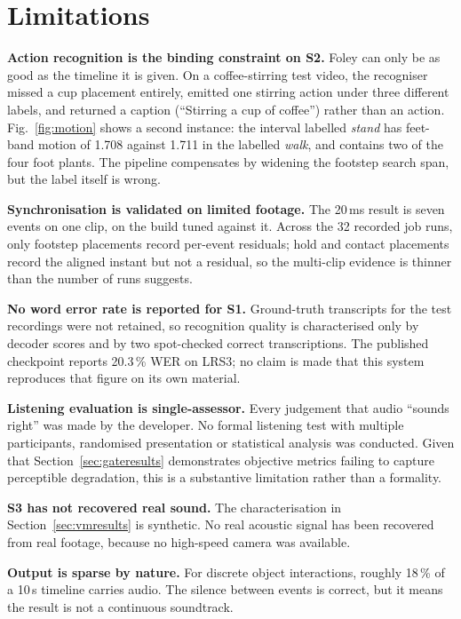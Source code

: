 \documentclass[conference]{IEEEtran}
\begin{document}
\section{Limitations}

\textbf{Action recognition is the binding constraint on S2.} Foley can only be as
good as the timeline it is given. On a coffee-stirring test video, the recogniser
missed a cup placement entirely, emitted one stirring action under three
different labels, and returned a caption (``Stirring a cup of coffee'') rather
than an action. Fig.~\ref{fig:motion} shows a second instance: the interval
labelled \emph{stand} has feet-band motion of 1.708 against 1.711 in the labelled
\emph{walk}, and contains two of the four foot plants. The pipeline compensates by
widening the footstep search span, but the label itself is wrong.

\textbf{Synchronisation is validated on limited footage.} The 20\,ms result is
seven events on one clip, on the build tuned against it. Across the 32 recorded
job runs, only footstep placements record per-event residuals; hold and contact
placements record the aligned instant but not a residual, so the multi-clip
evidence is thinner than the number of runs suggests.

\textbf{No word error rate is reported for S1.} Ground-truth transcripts for the
test recordings were not retained, so recognition quality is characterised only
by decoder scores and by two spot-checked correct transcriptions. The published
checkpoint reports 20.3\,\% WER on LRS3; no claim is made that this system
reproduces that figure on its own material.

\textbf{Listening evaluation is single-assessor.} Every judgement that audio
``sounds right'' was made by the developer. No formal listening test with
multiple participants, randomised presentation or statistical analysis was
conducted. Given that Section~\ref{sec:gateresults} demonstrates objective
metrics failing to capture perceptible degradation, this is a substantive
limitation rather than a formality.

\textbf{S3 has not recovered real sound.} The characterisation in
Section~\ref{sec:vmresults} is synthetic. No real acoustic signal has been
recovered from real footage, because no high-speed camera was available.

\textbf{Output is sparse by nature.} For discrete object interactions,
roughly 18\,\% of a 10\,s timeline carries audio. The silence between events is
correct, but it means the result is not a continuous soundtrack.
\end{document}
